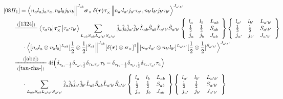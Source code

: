 \documentclass[master]{shnuthesis}
\newcommand{\bmr}{\textbf{\textit{r}}}
\newcommand{\ap}{a^\prime}
\newcommand{\bp}{b^\prime}
\newcommand{\il}{\!\!\!\!\!\!\!\!\!\!}
\newcommand{\ii}{\!\!\!\!\!\!\!\!\!\!\!\!\!\!\!\!\!\!\!\!}
\newcommand{\zdydh}{\xlongequal}
\begin{document}
\begin{align}
    &\ii [08H_1] = \Big\langle n_a l_a j_a \tau_a, n_b l_b j_b \tau_b \Big\|^{J_{ab}} \bm{\sigma}_\times \,\delta(\bmr) \bm{\tau}_\times^- \Big\| n_{\ap} l_{\ap} j_{\ap} \tau_{\ap}, n_{\bp} l_{\bp} j_{\bp} \tau_{\bp} \Big\rangle^{J_{\ap \bp}} \\
    &\il \xlongequal{(\ref{1324})} \big\langle \tau_a\tau_b \big|\bm{\tau}_\times^- \big|\tau_{\ap}\tau_{\bp}\big\rangle \sum_{L_{ab}S_{ab}L_{\ap\bp}S_{\ap\bp}} \hat{j}_a\hat{j}_b\hat{j}_{\ap}\hat{j}_{\bp}\hat{L}_{ab}\hat{S}_{ab}\hat{L}_{\ap\bp}\hat{S}_{\ap\bp}  \left\{\begin{array}{lll}l_{a} & l_{b} & L_{ab} \\ \frac{1}{2} & \frac{1}{2} & S_{ab} \\j_{a} & j_{b} & J_{ab} \end{array}\right\}  \left\{\begin{array}{lll}l_{\ap} & l_{\bp} & L_{\ap\bp} \\ \frac{1}{2} & \frac{1}{2} & S_{\ap\bp} \\j_{\ap} & j_{\bp} & J_{\ap\bp} \end{array}\right\}  \notag \\
    & \cdot \Big\langle [n_a l_a \otimes n_b l_b]^{L_{ab}} [\frac{1}{2}\otimes\frac{1}{2}]^{S_{ab}} \Big\|^{J_{ab}} [\delta(\bmr) \otimes \bm{\sigma}_\times]^1 \Big\| [n_{\ap} l_{\ap} \otimes n_{\bp} l_{\bp}]^{L_{\ap\bp}} [\frac{1}{2}\otimes\frac{1}{2}]^{S_{\ap\bp}} \Big\rangle^{J_{\ap \bp}} \\
    &\il \zdydh[(\ref{tau-cha-})]{(\ref{abc})} 4i \Big( \delta_{\tau_a,-\frac{1}{2}}\delta_{\tau_{\ap},\frac{1}{2}}\delta_{\tau_b,\tau_{\bp}}\tau_b - \delta_{\tau_b,-\frac{1}{2}}\delta_{\tau_{\bp},\frac{1}{2}}\delta_{\tau_a,\tau_{\ap}}\tau_a \Big) \notag\\
    & \cdot \sum_{L_{ab}S_{ab}L_{\ap\bp}S_{\ap\bp}} \hat{j}_a\hat{j}_b\hat{j}_{\ap}\hat{j}_{\bp}\hat{L}_{ab}\hat{S}_{ab}\hat{L}_{\ap\bp}\hat{S}_{\ap\bp}  \left\{\begin{array}{lll}l_{a} & l_{b} & L_{ab} \\ \frac{1}{2} & \frac{1}{2} & S_{ab} \\j_{a} & j_{b} & J_{ab} \end{array}\right\}  \left\{\begin{array}{lll}l_{\ap} & l_{\bp} & L_{\ap\bp} \\ \frac{1}{2} & \frac{1}{2} & S_{\ap\bp} \\j_{\ap} & j_{\bp} & J_{\ap\bp} \end{array}\right\}  \notag \\

\end{align}
\end{document}
